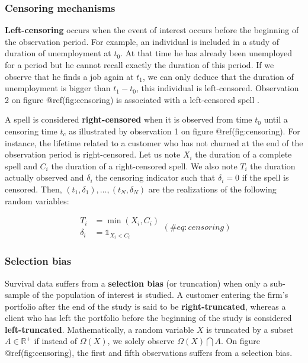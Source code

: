 \documentclass[
]{book}
\begin{document}
\hypertarget{censoring-mechanisms}{%
\subsubsection*{Censoring mechanisms}\label{censoring-mechanisms}}

\textbf{Left-censoring} occurs when the event of interest occurs before the beginning of the observation period. For example, an individual is included in a study of duration of unemployment at \(t_0\). At that time he has already been unemployed for a period but he cannot recall exactly the duration of this period. If we observe that he finds a job again at \(t_1\), we can only deduce that the duration of unemployment is bigger than \(t_1-t_0\), this individual is left-censored. Observation 2 on figure @ref(fig:censoring) is associated with a left-censored spell \citep{LIU_SCOR}.

A spell is considered \textbf{right-censored} when it is observed from time \(t_0\) until a censoring time \(t_c\) as illustrated by observation 1 on figure @ref(fig:censoring). For instance, the lifetime related to a customer who has not churned at the end of the observation period is right-censored. Let us note \(X_i\) the duration of a complete spell and \(C_i\) the duration of a right-censored spell. We also note \(T_i\) the duration actually observed and \(\delta_i\) the censoring indicator such that \(\delta_i = 0\) if the spell is censored. Then, \((t_1, \delta_1),\dots,(t_N, \delta_N)\) are the realizations of the following random variables:

\begin{equation}
  \begin{aligned}
  T_i & = \min(X_i, C_i) \\
  \delta_i & = \mathbb{1}_{X_i < C_i}
  \end{aligned}
  (\#eq:censoring)
\end{equation}

\hypertarget{selection-bias}{%
\subsubsection*{Selection bias}\label{selection-bias}}

Survival data suffers from a \textbf{selection bias} (or truncation) when only a sub-sample of the population of interest is studied. A customer entering the firm's portfolio after the end of the study is said to be \textbf{right-truncated}, whereas a client who has left the portfolio before the beginning of the study is considered \textbf{left-truncated}. Mathematically, a random variable \(X\) is truncated by a subset \(A \in \mathbb{R}^+\) if instead of \(\Omega(X)\), we solely observe \(\Omega(X)\bigcap A\). On figure @ref(fig:censoring), the first and fifth observations suffers from a selection bias.
\end{document}
